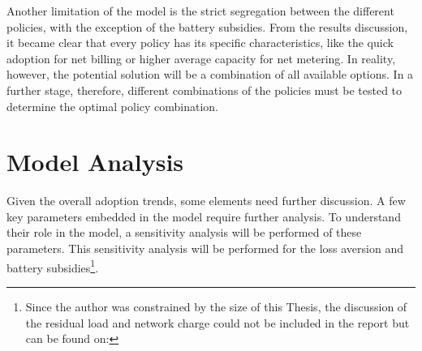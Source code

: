 \newline \newline \noindent
Another limitation of the model is the strict segregation between the different policies, with the exception of the battery subsidies. From the results discussion, it became clear that every policy has its specific characteristics, like the quick adoption for net billing or higher average capacity for net metering. In reality, however, the potential solution will be a combination of all available options. In a further stage, therefore, different combinations of the policies must be tested to determine the optimal policy combination. 
\section{Model Analysis} \label{analysis}
Given the overall adoption trends, some elements need further discussion. A few key parameters embedded in the model require further analysis. To understand their role in the model, a sensitivity analysis will be performed of these parameters. This sensitivity analysis will be performed for the loss aversion and battery subsidies\footnote{Since the author was constrained by the size of this Thesis, the discussion of the residual load and network charge could not be included in the report but can be found on: }.
